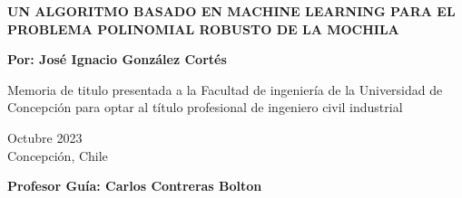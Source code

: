 \documentclass[spanish, a4paper, 12pt, twoside, openany,final]{book}
\numberwithin{equation}{section}                %
\def\biblio{\clearpage} %
\begin{document}
\def\biblio{}   %

\begin{titlepage}
	
	
	\thispagestyle{frontpage}
	
	\begin{center}
		
		\vspace*{4\baselineskip}
		
		
		{\Huge \textbf{UN ALGORITMO BASADO EN MACHINE LEARNING PARA EL PROBLEMA POLINOMIAL ROBUSTO DE LA MOCHILA\\}}
		\vspace*{1.5\baselineskip}
		
		
		\vspace*{1,5\baselineskip}
		
		\large{\textbf{Por: José Ignacio González Cortés}}\\
		
		\vspace{1,5\baselineskip}
		
		\large{Memoria de titulo presentada a la Facultad de ingeniería de la Universidad de Concepción para optar al título profesional de ingeniero civil industrial} 
		
		\vspace{1,5\baselineskip}
		Octubre 2023\\ %
		Concepción, Chile %
		\vspace{1,5\baselineskip}
		
		\large{\textbf{Profesor Guía: Carlos Contreras Bolton}}\\
		
	\end{center}
	
	\vspace*{4\baselineskip}
	
\end{titlepage}
\end{document}
